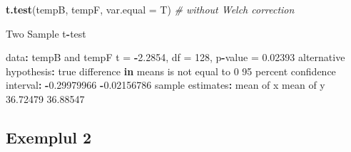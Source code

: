 \documentclass[]{article}
\newenvironment{Shaded}{\begin{snugshade}}{\end{snugshade}}
\newcommand{\KeywordTok}[1]{\textcolor[rgb]{0.13,0.29,0.53}{\textbf{#1}}}
\newcommand{\DataTypeTok}[1]{\textcolor[rgb]{0.13,0.29,0.53}{#1}}
\newcommand{\DecValTok}[1]{\textcolor[rgb]{0.00,0.00,0.81}{#1}}
\newcommand{\FloatTok}[1]{\textcolor[rgb]{0.00,0.00,0.81}{#1}}
\newcommand{\StringTok}[1]{\textcolor[rgb]{0.31,0.60,0.02}{#1}}
\newcommand{\CommentTok}[1]{\textcolor[rgb]{0.56,0.35,0.01}{\textit{#1}}}
\newcommand{\ControlFlowTok}[1]{\textcolor[rgb]{0.13,0.29,0.53}{\textbf{#1}}}
\newcommand{\OperatorTok}[1]{\textcolor[rgb]{0.81,0.36,0.00}{\textbf{#1}}}
\newcommand{\NormalTok}[1]{#1}
\begin{document}
\begin{Shaded}
\begin{Highlighting}[]
\KeywordTok{t.test}\NormalTok{(tempB, tempF, }\DataTypeTok{var.equal =}\NormalTok{ T) }\CommentTok{# without Welch correction }

\NormalTok{    Two Sample t}\OperatorTok{-}\NormalTok{test}

\NormalTok{data}\OperatorTok{:}\StringTok{  }\NormalTok{tempB and tempF}
\NormalTok{t =}\StringTok{ }\OperatorTok{-}\FloatTok{2.2854}\NormalTok{, df =}\StringTok{ }\DecValTok{128}\NormalTok{, p}\OperatorTok{-}\NormalTok{value =}\StringTok{ }\FloatTok{0.02393}
\NormalTok{alternative hypothesis}\OperatorTok{:}\StringTok{ }\NormalTok{true difference }\ControlFlowTok{in}\NormalTok{ means is not equal to }\DecValTok{0}
\DecValTok{95}\NormalTok{ percent confidence interval}\OperatorTok{:}
\StringTok{ }\OperatorTok{-}\FloatTok{0.29979966} \OperatorTok{-}\FloatTok{0.02156786}
\NormalTok{sample estimates}\OperatorTok{:}
\NormalTok{mean of x mean of y }
 \FloatTok{36.72479}  \FloatTok{36.88547} 
\end{Highlighting}
\end{Shaded}

\subsection{Exemplul 2}\label{exemplul-2}
\end{document}
